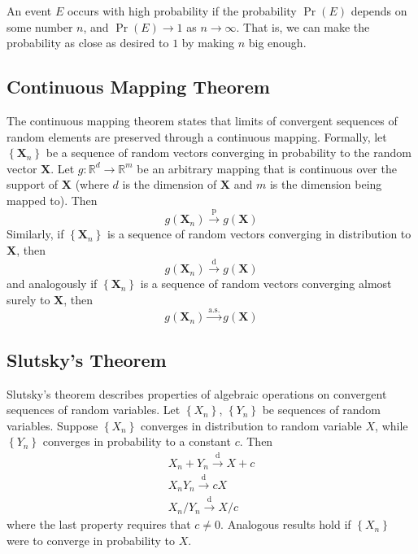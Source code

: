\documentclass[11pt]{report} %
\begin{document}
An event $E$ occurs with high probability if the probability $\operatorname{Pr}\left(E\right)$ depends on some number $n$, and $\operatorname{Pr}\left(E\right) \to 1$ as $n \to \infty$. That is, we can make the probability as close as desired to $1$ by making $n$ big enough.

\subsection{Continuous Mapping Theorem}

The continuous mapping theorem states that limits of convergent sequences of random elements are preserved through a continuous mapping. Formally, let $\left\{\mathbf{X}_{n}\right\}$ be a sequence of random vectors converging in probability to the random vector $\mathbf{X}$. Let $g: \mathbb{R}^{d} \to \mathbb{R}^{m}$ be an arbitrary mapping that is continuous over the support of $\mathbf{X}$ (where $d$ is the dimension of $\mathbf{X}$ and $m$ is the dimension being mapped to). Then
\begin{equation}
g\left(\mathbf{X}_{n}\right) \overset{\mathrm{p}}\to g\left(\mathbf{X}\right)
\end{equation}
Similarly, if $\left\{\mathbf{X}_{n}\right\}$ is a sequence of random vectors converging in distribution to $\mathbf{X}$, then
\begin{equation}
g\left(\mathbf{X}_{n}\right) \overset{\mathrm{d}}\to g\left(\mathbf{X}\right)
\end{equation}
and analogously if $\left\{\mathbf{X}_{n}\right\}$ is a sequence of random vectors converging almost surely to $\mathbf{X}$, then
\begin{equation}
g\left(\mathbf{X}_{n}\right) \overset{\mathrm{a.s.}}\to g\left(\mathbf{X}\right)
\end{equation}

\subsection{Slutsky's Theorem}

Slutsky's theorem describes properties of algebraic operations on convergent sequences of random variables. Let $\left\{X_{n}\right\}$, $\left\{Y_{n}\right\}$ be sequences of random variables. Suppose $\left\{X_{n}\right\}$ converges in distribution to random variable $X$, while $\left\{Y_{n}\right\}$ converges in probability to a constant $c$. Then
\begin{gather}
X_{n} + Y_{n} \overset{\mathrm{d}}{\to} X + c \\
X_{n}Y_{n} \overset{\mathrm{d}}{\to} cX \\
X_{n}/Y_{n} \overset{\mathrm{d}}{\to} X/c
\end{gather}
where the last property requires that $c\neq 0$. Analogous results hold if $\left\{X_{n}\right\}$ were to converge in probability to $X$.
\end{document}
